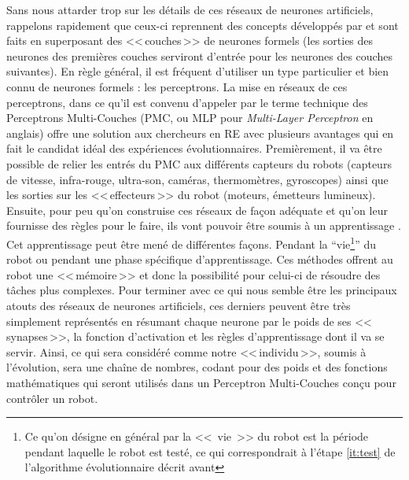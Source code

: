 Sans nous attarder trop sur les détails de ces réseaux de neurones artificiels, rappelons rapidement que ceux-ci reprennent des concepts développés par \citep{mcculloch1943alogicalcideaimmanervacti} et sont faits en superposant des <<\,couches\,>> de neurones formels (les sorties des neurones des premières couches serviront d'entrée pour les neurones des couches suivantes). En règle général, il est fréquent d'utiliser un type particulier et bien connu de neurones formels : les perceptrons. La mise en réseaux de ces perceptrons, dans ce qu'il est convenu d'appeler par le terme technique des Perceptrons Multi-Couches (PMC, ou MLP pour \emph{Multi-Layer Perceptron} en anglais) offre une solution aux chercheurs en RE avec plusieurs avantages qui en fait le candidat idéal des expériences évolutionnaires. Premièrement, il va être possible de relier les entrés du PMC aux différents capteurs du robots (capteurs de vitesse, infra-rouge, ultra-son, caméras, thermomètres, gyroscopes) ainsi que les sorties sur les <<\,effecteurs\,>> du robot (moteurs, émetteurs lumineux). Ensuite, pour peu qu'on construise ces réseaux de façon adéquate et qu'on leur fournisse des règles pour le faire, ils vont pouvoir être soumis à un apprentissage \citep[p. 30-39]{nolfi00evolrobobiolintetechselfmach}. Cet apprentissage peut être mené de différentes façons. Pendant la ``vie\footnote{Ce qu'on désigne en général par la <<~vie~>> du robot est la période pendant laquelle le robot est testé, ce qui correspondrait à l'étape \ref{it:test} de l'algorithme évolutionnaire décrit avant}'' du robot ou pendant une phase spécifique d'apprentissage. Ces méthodes offrent au robot une <<\,mémoire\,>> et donc la possibilité pour celui-ci de résoudre des tâches plus complexes. Pour terminer avec ce qui nous semble être les principaux atouts des réseaux de neurones artificiels, ces derniers peuvent être très simplement représentés en résumant chaque neurone par le poids de ses <<\,synapses\,>>, la fonction d'activation et les règles d'apprentissage dont il va se servir. Ainsi, ce qui sera considéré comme notre <<\,individu\,>>, soumis à l'évolution, sera une chaîne de nombres, codant pour des poids et des fonctions mathématiques qui seront utilisés dans un Perceptron Multi-Couches conçu pour contrôler un robot.


